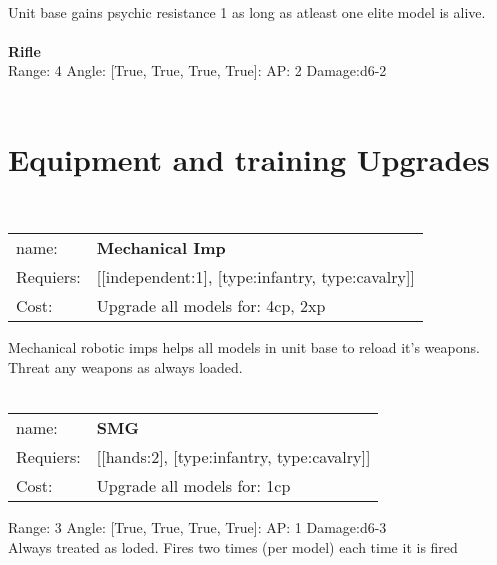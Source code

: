 \ \\
Unit base gains psychic resistance 1 as long as atleast one elite model is alive.\\ 

\ \\
{\bf Rifle } \\



Range: 4  Angle: [True, True, True, True]: AP: 2 Damage:d6-2 \\




 
\ \\

\section{Equipment and training Upgrades}\ \\
\begin{tabular}{ll}
name: & {\bf Mechanical Imp } \\
Requiers: & [[independent:1], [type:infantry, type:cavalry]] \\
Cost: & Upgrade all models for: 4cp, 2xp \\
\end{tabular}

Mechanical robotic imps helps all models in unit base to reload it's weapons. Threat any weapons as always loaded.\\ 









\ \\
\begin{tabular}{ll}
name: & {\bf SMG } \\
Requiers: & [[hands:2], [type:infantry, type:cavalry]] \\
Cost: & Upgrade all models for: 1cp \\
\end{tabular}



Range: 3  Angle: [True, True, True, True]: AP: 1 Damage:d6-3 \\
Always treated as loded. Fires two times (per model) each time it is fired\\ 







